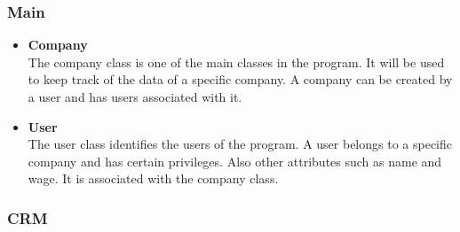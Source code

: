 \subsubsection*{Main}

\begin{itemize}
  \item \textbf{Company} \\
The company class is one of the main classes in the program. It will be used to keep track of the data of a specific company. A company can be created by a user and has users associated with it.
  
  
  

  \item \textbf{User} \\
The user class identifies the users of the program. A user belongs to a specific company and has certain privileges. Also other attributes such as name and wage. It is associated with the company class.
  
\end{itemize}

\subsubsection*{CRM}

